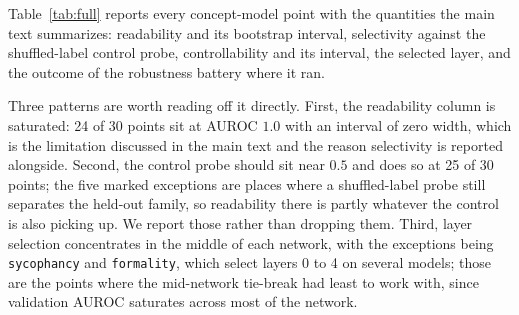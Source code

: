 \documentclass{article}
\begin{document}
\label{app:full}

Table~\ref{tab:full} reports every concept-model point with the quantities the
main text summarizes: readability and its bootstrap interval, selectivity
against the shuffled-label control probe, controllability and its interval, the
selected layer, and the outcome of the robustness battery where it ran.

Three patterns are worth reading off it directly. First, the readability column
is saturated: 24 of 30 points sit at AUROC $1.0$ with an interval of zero width,
which is the limitation discussed in the main text and the reason selectivity is
reported alongside. Second, the control probe should sit near $0.5$ and does so
at 25 of 30 points; the five marked exceptions are places where a shuffled-label
probe still separates the held-out family, so readability there is partly
whatever the control is also picking up. We report those rather than dropping
them. Third, layer selection concentrates in the middle of each network, with
the exceptions being \texttt{sycophancy} and \texttt{formality}, which select
layers 0 to 4 on several models; those are the points where the mid-network
tie-break had least to work with, since validation AUROC saturates across most
of the network.
\end{document}
